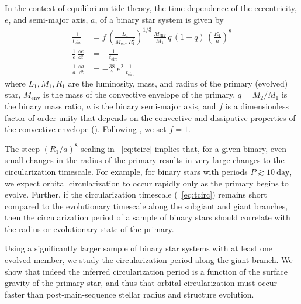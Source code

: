 \documentclass[modern, letterpaper]{aastex62}
\begin{document}
In the context of equilibrium tide theory, the time-dependence of the
eccentricity, $e$, and semi-major axis, $a$, of a binary star system is given by
\begin{align}
    \frac{1}{t_\textrm{circ}} &= f \,
        \left(\frac{L_1}{M_{\textrm{env}} \, R_1^2}\right)^{1/3} \,
        \frac{M_{\textrm{env}}}{M_1} \,
        q \, (1 + q) \,
        \left(\frac{R_1}{a}\right)^8 \label{eq:tcirc}\\
    \frac{1}{e} \, \frac{\dd e}{\dd t} &= - \frac{1}{t_\textrm{circ}}
        \label{eq:dlne} \\
    \frac{1}{a} \, \frac{\dd a}{\dd t} &= - \frac{38}{7} \, e^2 \,
        \frac{1}{t_\textrm{circ}} \label{eq:dlna}
\end{align}
where $L_1, M_1, R_1$ are the luminosity, mass, and radius of the primary
(evolved) star, $M_{\textrm{env}}$ is the mass of the convective envelope of the
primary, $q = M_2 / M_1$ is the binary mass ratio, $a$ is the binary semi-major
axis, and $f$ is a dimensionless factor of order unity that depends on the
convective and dissipative properties of the convective envelope
(\citealt{Zahn:1977,Zahn:1989,Verbunt:1995}).
Following \citet{Verbunt:1995}, we set $f=1$.

The steep $\left(R_1 / a\right)^8$ scaling in \eqname~\ref{eq:tcirc}
implies that, for a given binary, even small changes in the radius of the
primary results in very large changes to the circularization timescale.
For example, for binary stars with periods $P \gtrsim 10~\textrm{day}$, we
expect orbital circularization to occur rapidly only as the primary begins to
evolve.
Further, if the circularization timescale (\eqname~\ref{eq:tcirc}) remains short
compared to the evolutionary timescale along the subgiant and giant branches,
then the circularization period of a sample of binary stars should correlate
with the radius or evolutionary state of the primary.

Using a significantly larger sample of binary star systems with at least one
evolved member, we study the circularization period along the giant branch.
We show that indeed the inferred circularization period is a function of the
surface gravity of the primary star, and thus that orbital circularization must
occur faster than post-main-sequence stellar radius and structure evolution.

\end{document}
